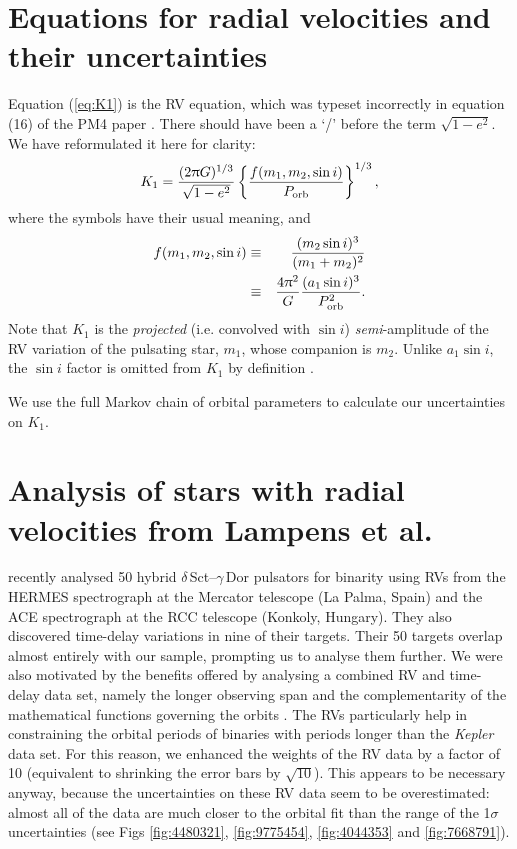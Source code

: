 \documentclass[a4paper,fleqn,usenatbib]{mnras}
\begin{document}


\section{Equations for radial velocities and their uncertainties}
\label{app:RV_eq}

Equation (\ref{eq:K1}) is the RV equation, which was typeset incorrectly in equation (16) of the PM4 paper \citep{murphyetal2016b}. There should have been a `/' before the term $\sqrt{1-e^2}$. We have reformulated it here for clarity:
\begin{eqnarray}
	K_1 = \frac{(2\uppi G)^{1/3}}{\sqrt{1-e^2}} \left\{ {{ f(m_1,m_2,\sin i) }\over{P_{\rm orb}}} \right\}^{1/3},
\label{eq:K1}
\end{eqnarray}
where the symbols have their usual meaning, and
\begin{eqnarray}
	f(m_1,m_2,\sin i) 	&\equiv& \frac{(m_2 \sin i)^3}{(m_1 + m_2)^2}\label{eq:fm}\\
					&\equiv& \frac{4\uppi^2}{G}\frac{(a_1 \sin i)^3}{P_{\rm orb}^2}.\label{eq:fmorb}
\end{eqnarray}
Note that $K_1$ is the {\it projected} (i.e. convolved with $\sin i$) {\it semi}-amplitude of the RV variation of the pulsating star, $m_1$, whose companion is $m_2$. Unlike $a_1 \sin i$, the $\sin i$ factor is omitted from $K_1$ by definition \citep{aitken1918}.

We use the full Markov chain of orbital parameters to calculate our uncertainties on $K_1$.




\section{Analysis of stars with radial velocities from Lampens et al.}
\label{sec:lampens}

\citet{lampensetal2017} recently analysed 50 hybrid $\delta$\,Sct--$\gamma$\,Dor pulsators for binarity using RVs from the HERMES spectrograph at the Mercator telescope (La Palma, Spain) and the ACE spectrograph at the RCC telescope (Konkoly, Hungary). They also discovered time-delay variations in nine of their targets. Their 50 targets overlap almost entirely with our sample, prompting us to analyse them further. We were also motivated by the benefits offered by analysing a combined RV and time-delay data set, namely the longer observing span and the complementarity of the mathematical functions governing the orbits \citep{murphyetal2016b}. The RVs particularly help in constraining the orbital periods of binaries with periods longer than the \textit{Kepler} data set. For this reason, we enhanced the weights of the RV data by a factor of 10 (equivalent to shrinking the error bars by $\sqrt{10}$). This appears to be necessary anyway, because the uncertainties on these RV data seem to be overestimated: almost all of the data are much closer to the orbital fit than the range of the 1$\sigma$ uncertainties (see Figs \ref{fig:4480321}, \ref{fig:9775454}, \ref{fig:4044353} and \ref{fig:7668791}).
\end{document}

